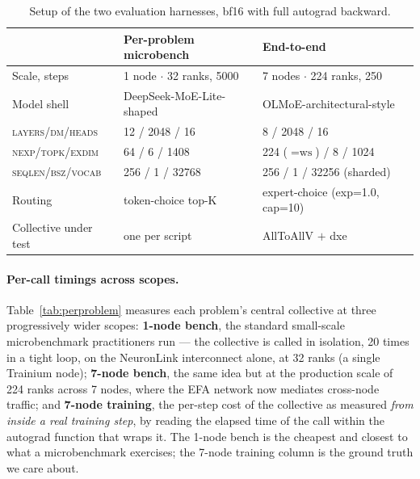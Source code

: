\begin{table}[h]
\centering\small
\setlength{\tabcolsep}{4pt}
\begin{tabular}{lll}
\toprule
 & \textbf{Per-problem microbench} & \textbf{End-to-end} \\
\midrule
Scale, steps     & 1 node $\cdot$ 32 ranks, 5000          & 7 nodes $\cdot$ 224 ranks, 250 \\
Model shell      & DeepSeek-MoE-Lite-shaped   & OLMoE-architectural-style \\
\textsc{layers/dm/heads}    & 12 / 2048 / 16  & 8 / 2048 / 16 \\
\textsc{nexp/topk/exdim}    & 64 / 6 / 1408             & 224 ($=\!\text{ws}$) / 8 / 1024 \\
\textsc{seqlen/bsz/vocab}   & 256 / 1 / 32768 & 256 / 1 / 32256 (sharded) \\
Routing          & token-choice top-K          & expert-choice (exp=1.0, cap=10) \\
Collective under test & one per script         & AllToAllV $+$ dxe \\
\bottomrule
\end{tabular}
\caption{Setup of the two evaluation harnesses, bf16 with full
autograd backward.}
\label{tab:setup}
\end{table}

\paragraph{Per-call timings across scopes.} Table~\ref{tab:perproblem}
measures each problem's central collective at three
progressively wider scopes: \textbf{1-node bench}, the standard
small-scale microbenchmark practitioners run --- the collective
is called in isolation, 20 times in a tight loop, on the
NeuronLink interconnect alone, at 32 ranks (a single Trainium
node); \textbf{7-node bench}, the same idea but at the
production scale of 224 ranks across 7 nodes, where the EFA
network now mediates cross-node traffic; and \textbf{7-node
training}, the per-step cost of the collective as measured
\emph{from inside a real training step}, by reading the elapsed
time of the call within the autograd function that wraps it.
The 1-node bench is the cheapest and closest to what a
microbenchmark exercises; the 7-node training column is the
ground truth we care about.

